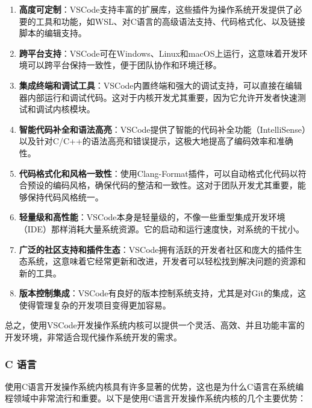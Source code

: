 \begin{enumerate}
    \item \textbf{高度可定制}：VSCode支持丰富的扩展库，这些插件为操作系统开发提供了必要的工具和功能，如WSL、对C语言的高级语法支持、代码格式化、以及链接脚本的编辑支持。
    \item \textbf{跨平台支持}：VSCode可在Windows、Linux和macOS上运行，这意味着开发环境可以跨平台保持一致性，便于团队协作和环境迁移。
    \item \textbf{集成终端和调试工具}：VSCode内置终端和强大的调试支持，可以直接在编辑器内部运行和调试代码。这对于内核开发尤其重要，因为它允许开发者快速测试和调试内核模块。
    \item \textbf{智能代码补全和语法高亮}：VSCode提供了智能的代码补全功能（IntelliSense）以及针对C/C++的语法高亮和错误提示，这极大地提高了编码效率和准确性。
    \item \textbf{代码格式化和风格一致性}：使用Clang-Format插件，可以自动格式化代码以符合预设的编码风格，确保代码的整洁和一致性。这对于团队开发尤其重要，能够保持代码风格统一。
    \item \textbf{轻量级和高性能}：VSCode本身是轻量级的，不像一些重型集成开发环境（IDE）那样消耗大量系统资源。它的启动和运行速度快，对系统的干扰小。
    \item \textbf{广泛的社区支持和插件生态}：VSCode拥有活跃的开发者社区和庞大的插件生态系统，这意味着它经常更新和改进，开发者可以轻松找到解决问题的资源和新的工具。
    \item \textbf{版本控制集成}：VSCode有良好的版本控制系统支持，尤其是对Git的集成，这使得管理复杂的开发项目变得更加容易。
\end{enumerate}

总之，使用VSCode开发操作系统内核可以提供一个灵活、高效、并且功能丰富的开发环境，非常适合现代操作系统开发的需求。

\subsubsection{C 语言}

使用C语言开发操作系统内核具有许多显著的优势，这也是为什么C语言在系统编程领域中非常流行和重要。以下是使用C语言开发操作系统内核的几个主要优势：

